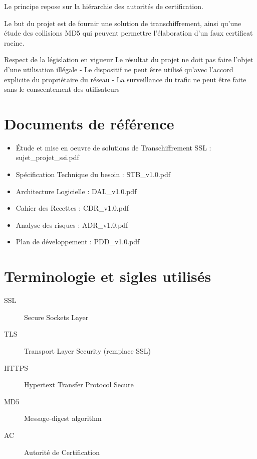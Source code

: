 \documentclass[a4paper,11pt,french]{article}
\begin{document}
Le principe repose sur la hiérarchie des autorités de certification.

Le but du projet est de fournir une solution de transchiffrement, ainsi qu'une étude des collisions MD5 qui peuvent permettre l'élaboration d'un faux certificat racine.

Respect de la législation en vigueur
Le résultat du projet ne doit pas faire l'objet d'une utilisation illégale
- Le dispositif ne peut être utilisé qu'avec l'accord explicite du propriétaire du réseau
- La surveillance du trafic ne peut être faite sans le conscentement des utilisateurs
\newpage
\section{Documents de référence}

\begin{itemize}
\item Étude et mise en oeuvre de solutions de Transchiffrement SSL : sujet\_projet\_ssi.pdf
\item Spécification Technique du besoin : STB\_v1.0.pdf
\item Architecture Logicielle : DAL\_v1.0.pdf
\item Cahier des Recettes : CDR\_v1.0.pdf
\item Analyse des risques : ADR\_v1.0.pdf
\item Plan de développement : PDD\_v1.0.pdf
\end{itemize}

\newpage
\section{Terminologie et sigles utilisés}

\begin{description}
\item[SSL] Secure Sockets Layer
\item[TLS] Transport Layer Security (remplace SSL)
\item[HTTPS] Hypertext Transfer Protocol Secure
\item[MD5] Message-digest algorithm
\item[AC] Autorité de Certification
\end{description}

\end{document}
